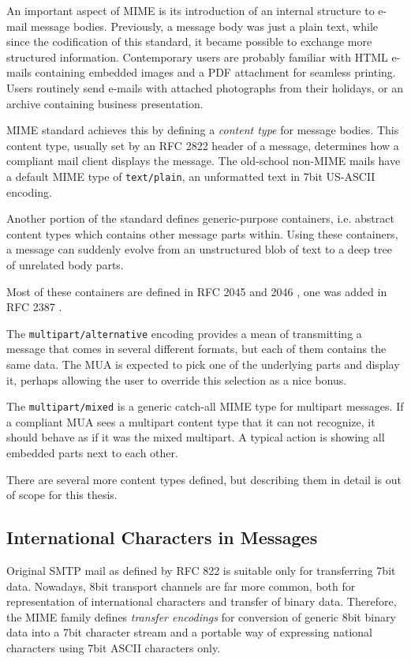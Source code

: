 \documentclass[12pt,notitlepage]{report}
\begin{document}
An important aspect of MIME is its introduction of an internal structure to
e-mail message bodies.  Previously, a message body was just a plain text, while
since the codification of this standard, it became possible to exchange more
structured information.  Contemporary users are probably familiar with HTML
e-mails containing embedded images and a PDF attachment for seamless printing.
Users routinely send e-mails with attached photographs from their holidays, or an
archive containing business presentation.

MIME standard achieves this by defining a {\em content type} for message
bodies.  This content type, usually set by an RFC 2822 header of a
message, determines how a compliant mail client displays the message.  The
old-school non-MIME mails have a default MIME type of {\tt text/plain}, an
unformatted text in 7bit US-ASCII encoding.

Another portion of the standard defines generic-purpose containers, i.e.
abstract content types which contains other message parts within.  Using
these containers, a message can suddenly evolve from an unstructured blob of
text to a deep tree of unrelated body parts.

Most of these containers are defined in RFC 2045 \cite{rfc-2045} and 2046
\cite{rfc-2046}, one was added in RFC 2387 \cite{rfc-multipart-related}.

The {\tt multipart/alternative} encoding provides a mean of transmitting a
message that comes in several different formats, but each of them contains the same data.  The
MUA is expected to pick one of the underlying parts and display it, perhaps
allowing the user to override this selection as a nice bonus.

The {\tt multipart/mixed} is a generic catch-all MIME type for multipart
messages.  If a compliant MUA sees a multipart content type that it can not
recognize, it should behave as if it was the mixed multipart.  A typical action is
showing all embedded parts next to each other.

There are several more content types defined, but describing them in detail is
out of scope for this thesis.

\subsection{International Characters in Messages}

Original SMTP mail as defined by RFC 822 is suitable only for transferring
7bit data.  Nowadays, 8bit transport channels are far more common, both for representation of
international characters and transfer of binary data.  Therefore, the MIME
family defines {\em transfer encodings} for conversion of generic 8bit binary
data into a 7bit character stream and a portable way of expressing national
characters using 7bit ASCII characters only.
\end{document}
